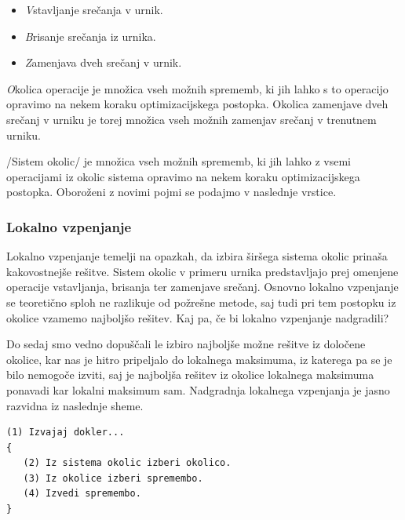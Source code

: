 \documentclass[a4paper,10pt]{article}
\begin{document}
   
   \begin{itemize}
      \item \emph Vstavljanje srečanja v urnik.
      \item \emph Brisanje srečanja iz urnika.
      \item \emph Zamenjava dveh srečanj v urnik.
   \end{itemize}

\noindent
\emph Okolica operacije je množica vseh možnih sprememb, ki jih lahko s to operacijo
opravimo na nekem koraku optimizacijskega postopka. Okolica zamenjave dveh srečanj v urniku
je torej množica vseh možnih zamenjav srečanj v trenutnem urniku.

/Sistem okolic/ je množica vseh možnih sprememb, ki jih lahko z vsemi operacijami iz
okolic sistema opravimo na nekem koraku optimizacijskega postopka. Oboroženi z novimi pojmi
se podajmo v naslednje vrstice.

\subsubsection{Lokalno vzpenjanje} %

Lokalno vzpenjanje temelji na opazkah, da izbira širšega sistema okolic prinaša kakovostnejše
rešitve. Sistem okolic v primeru urnika predstavljajo prej omenjene operacije vstavljanja,
brisanja ter zamenjave srečanj. Osnovno lokalno vzpenjanje se teoretično sploh ne razlikuje
od požrešne metode, saj tudi pri tem postopku iz okolice vzamemo najboljšo rešitev. Kaj pa,
če bi lokalno vzpenjanje nadgradili?

Do sedaj smo vedno dopuščali le izbiro najboljše možne rešitve iz določene okolice, kar nas
je hitro pripeljalo do lokalnega maksimuma, iz katerega pa se je bilo nemogoče izviti, saj
je najboljša rešitev iz okolice lokalnega maksimuma ponavadi kar lokalni maksimum sam.
Nadgradnja lokalnega vzpenjanja je jasno razvidna iz naslednje sheme.

\begin{verbatim}
(1) Izvajaj dokler...
{
   (2) Iz sistema okolic izberi okolico.
   (3) Iz okolice izberi spremembo.
   (4) Izvedi spremembo.
}
\end{verbatim}
\end{document}
